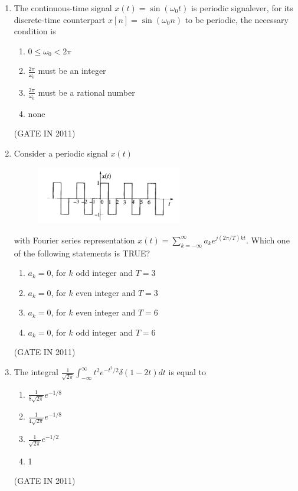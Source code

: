 \documentclass[journal]{IEEEtran}
\begin{document}
\begin{enumerate}
\item The continuous-time signal $ x(t) = \sin(\omega_0 t) $ is periodic signalever, for its discrete-time counterpart $ x[n] = \sin(\omega_0 n) $ to be periodic, the necessary condition is
\begin{multicols}{2}
\begin{enumerate}
\item $0 \leq \omega_0 < 2\pi$
\item $ \frac{2\pi}{\omega_0} $ must be an integer
\item $ \frac{2\pi}{\omega_0} $ must be a rational number
\item none
\end{enumerate}
\end{multicols} \hfill(GATE IN 2011)

\item Consider a periodic signal $ x(t) $ 
\begin{figure}[H]
    \centering
      \includegraphics[width=0.6\textwidth]{1.png} 
      \caption{}
    \label{fig:fig1} 
\end{figure}
with Fourier series representation $ x(t) = \sum_{k=-\infty}^{\infty} a_k e^{j(2\pi/T)kt} $. Which one of the following statements is TRUE?
\begin{multicols}{2}
\begin{enumerate}
\item $ a_k = 0 $, for $ k $ odd integer and $ T = 3 $
\item $ a_k = 0 $, for $ k $ even integer and $ T = 3 $
\item $ a_k = 0 $, for $ k $ even integer and $ T = 6 $
\item $ a_k = 0 $, for $ k $ odd integer and $ T = 6 $
\end{enumerate}
\end{multicols} \hfill(GATE IN 2011)

\item The integral
$ \frac{1}{\sqrt{2\pi}} \int_{-\infty}^{\infty} t^2 e^{-t^2/2} \delta(1-2t) dt $ is equal to

\begin{multicols}{4}
\begin{enumerate}
\item $\frac{1}{8\sqrt{2\pi}} e^{-1/8}$
\item $\frac{1}{4\sqrt{2\pi}} e^{-1/8}$
\item $\frac{1}{\sqrt{2\pi}} e^{-1/2}$
\item 1
\end{enumerate}
\end{multicols} \hfill(GATE IN 2011)


\end{enumerate}
\end{document}
